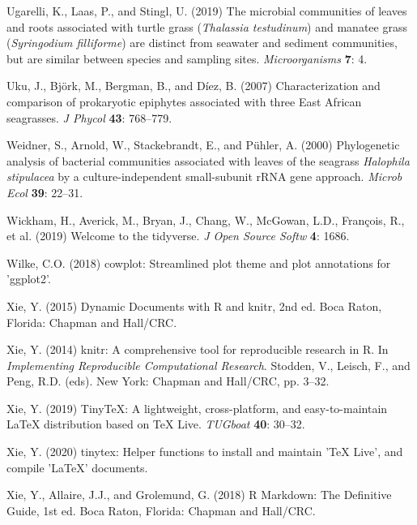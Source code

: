 \documentclass[12pt,]{article}
\begin{document}
\leavevmode\hypertarget{ref-Ugarelli2019}{}%
Ugarelli, K., Laas, P., and Stingl, U. (2019) The microbial communities
of leaves and roots associated with turtle grass (\emph{Thalassia
testudinum}) and manatee grass (\emph{Syringodium filliforme}) are
distinct from seawater and sediment communities, but are similar between
species and sampling sites. \emph{Microorganisms} \textbf{7}: 4.

\leavevmode\hypertarget{ref-Uku2007}{}%
Uku, J., Björk, M., Bergman, B., and Díez, B. (2007) Characterization
and comparison of prokaryotic epiphytes associated with three East
African seagrasses. \emph{J Phycol} \textbf{43}: 768--779.

\leavevmode\hypertarget{ref-Weidner2000}{}%
Weidner, S., Arnold, W., Stackebrandt, E., and Pühler, A. (2000)
Phylogenetic analysis of bacterial communities associated with leaves of
the seagrass \emph{Halophila stipulacea} by a culture-independent
small-subunit rRNA gene approach. \emph{Microb Ecol} \textbf{39}:
22--31.

\leavevmode\hypertarget{ref-Wickham2019}{}%
Wickham, H., Averick, M., Bryan, J., Chang, W., McGowan, L.D., François,
R., et al. (2019) Welcome to the tidyverse. \emph{J Open Source Softw}
\textbf{4}: 1686.

\leavevmode\hypertarget{ref-Wilke2018}{}%
Wilke, C.O. (2018) cowplot: Streamlined plot theme and plot annotations
for 'ggplot2'.

\leavevmode\hypertarget{ref-Xie2015}{}%
Xie, Y. (2015) Dynamic Documents with R and knitr, 2nd ed. Boca Raton,
Florida: Chapman and Hall/CRC.

\leavevmode\hypertarget{ref-Xie2014}{}%
Xie, Y. (2014) knitr: A comprehensive tool for reproducible research in
R. In \emph{Implementing Reproducible Computational Research}. Stodden,
V., Leisch, F., and Peng, R.D. (eds). New York: Chapman and Hall/CRC,
pp. 3--32.

\leavevmode\hypertarget{ref-Xie2019a}{}%
Xie, Y. (2019) TinyTeX: A lightweight, cross-platform, and
easy-to-maintain LaTeX distribution based on TeX Live. \emph{TUGboat}
\textbf{40}: 30--32.

\leavevmode\hypertarget{ref-Xie2020}{}%
Xie, Y. (2020) tinytex: Helper functions to install and maintain 'TeX
Live', and compile 'LaTeX' documents.

\leavevmode\hypertarget{ref-Xie2018}{}%
Xie, Y., Allaire, J.J., and Grolemund, G. (2018) R Markdown: The
Definitive Guide, 1st ed. Boca Raton, Florida: Chapman and Hall/CRC.
\end{document}
